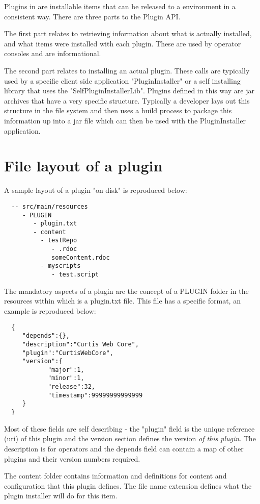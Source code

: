 Plugins in \Rapture are installable items that can be released to a \Rapture environment in
a consistent way. There are three parts to the Plugin API.

The first part relates to retrieving information about what is actually installed, and what items were installed with each
plugin. These are used by operator consoles and are informational.

The second part relates to installing an actual plugin. These calls are typically used by a specific
client side application "PluginInstaller" or a self installing library that uses the "SelfPluginInstallerLib". Plugins
defined in this way are jar archives that have a very specific structure. Typically a developer lays out this structure
in the file system and then uses a build process to package this information up into a jar file which can then be used with
the PluginInstaller application.

\section{File layout of a plugin}

A sample layout of a plugin "on disk" is reproduced below:

\begin{Verbatim}
  -- src/main/resources
     - PLUGIN
        - plugin.txt
        - content
          - testRepo
             - .rdoc
             someContent.rdoc
          - myscripts
             - test.script
\end{Verbatim}

The mandatory aspects of a plugin are the concept of a PLUGIN folder in the resources within
which is a plugin.txt file. This file has a specific format, an example is reproduced below:

\begin{Verbatim}
  {
     "depends":{},
     "description":"Curtis Web Core",
     "plugin":"CurtisWebCore",
     "version":{
     		"major":1,
     		"minor":1,
     		"release":32,
     		"timestamp":99999999999999
     }
  }
\end{Verbatim}

Most of these fields are self describing - the "plugin" field is the unique reference (uri) of this
plugin and the version section defines the version \emph{of this plugin}. The description is for operators
and the depends field can contain a map of other plugins and their version numbers required.

The content folder contains information and definitions for content and configuration that this plugin defines. The
file name extension defines what the plugin installer will do for this item.


